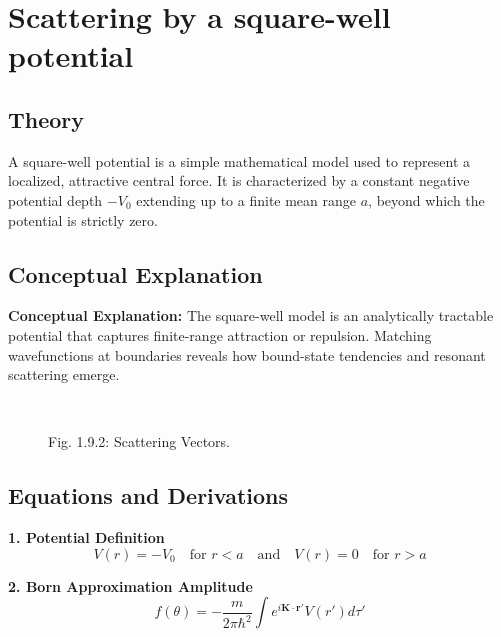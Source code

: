 \documentclass[12pt]{report}
\begin{document}
\section{Scattering by a square-well potential}



\subsection*{Theory}
A square-well potential is a simple mathematical model used to represent a localized, attractive central force. It is characterized by a constant negative potential depth $-V_0$ extending up to a finite mean range $a$, beyond which the potential is strictly zero.


\subsection{Conceptual Explanation}
\textbf{Conceptual Explanation:} The square-well model is an analytically tractable potential that captures finite-range attraction or repulsion. Matching wavefunctions at boundaries reveals how bound-state tendencies and resonant scattering emerge.


\begin{figure}[H]
    \centering
    
    \caption{Fig. 1.9.1: The Square-Well Potential.}
    \vspace{0.8cm}
     \\
    \caption{Fig. 1.9.2: Scattering Vectors.}
\end{figure}

\subsection*{Equations and Derivations}

\textbf{1. Potential Definition}
\begin{equation*}
V(r) = -V_0 \quad \text{for } r < a \quad \text{and} \quad V(r) = 0 \quad \text{for } r > a
\end{equation*}

\textbf{2. Born Approximation Amplitude}
\begin{equation}
f(\theta) = -\frac{m}{2\pi \hbar^2} \int e^{i\mathbf{K} \cdot \mathbf{r}'} V(r') d\tau'
\end{equation}
\end{document}
